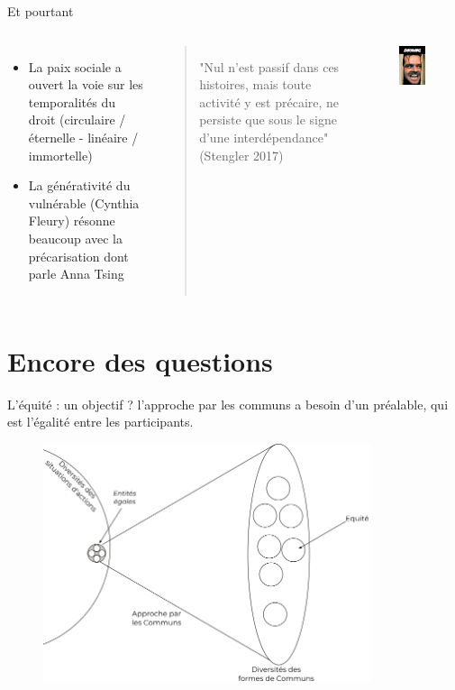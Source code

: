 \documentclass[newPxFont]{beamer}
\begin{document}
\begin{frame}[c]{Et pourtant}
  \vspace{-1cm}
  \begin{columns}[onlytextwidth,T]
    \column{\dimexpr\linewidth-30mm-5mm}
    \begin{itemize}
        \item La paix sociale a ouvert la voie sur les temporalités du droit (circulaire / éternelle - linéaire / immortelle)
        \item La générativité du vulnérable (Cynthia Fleury) résonne beaucoup avec la précarisation dont parle Anna Tsing
    \end{itemize}
    \vspace{1cm}
    \begin{quotation}
      "Nul n'est passif dans ces histoires, mais toute activité y est précaire, ne persiste que sous le signe d'une interdépendance" (Stengler 2017)
    \end{quotation}
    \column{30mm}
    \begin{figure}
      \includegraphics[width=4cm]{img/shining.jpg}
    \end{figure}
  \end{columns}
\end{frame}

\section{Encore des questions}

\begin{frame}[c]{L'équité : un objectif ?}
  \vspace{-1cm}
  l'approche par les communs a besoin d'un préalable, qui est l'égalité entre les participants.
  \begin{figure}
    \includegraphics[height=7cm]{img/commun_egalite_equite.png}
  \end{figure}
\end{frame}
\end{document}
